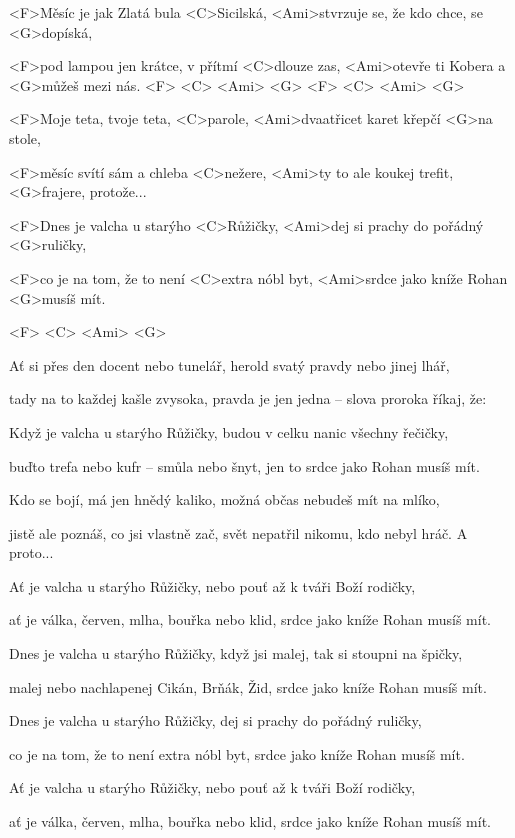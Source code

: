

\zs
<F>Měsíc je jak Zlatá bula <C>Sicilská,
<Ami>stvrzuje se, že kdo chce, se <G>dopíská,

<F>pod lampou jen krátce, v přítmí <C>dlouze zas,
<Ami>otevře ti Kobera a <G>můžeš mezi nás.
<F> <C> <Ami> <G> <F> <C> <Ami> <G>
\ks

\zs
<F>Moje teta, tvoje teta, <C>parole,
<Ami>dvaatřicet karet křepčí <G>na stole,

<F>měsíc svítí sám a chleba <C>nežere,
<Ami>ty to ale koukej trefit, <G>frajere, protože...
\ks

\zr
<F>Dnes je valcha u starýho <C>Růžičky,
<Ami>dej si prachy do pořádný <G>ruličky,

<F>co je na tom, že to není <C>extra nóbl byt,
<Ami>srdce jako kníže Rohan <G>musíš mít.

<F> <C> <Ami> <G>
\kr

\zs
Ať si přes den docent nebo tunelář,
herold svatý pravdy nebo jinej lhář,

tady na to každej kašle zvysoka,
pravda je jen jedna -- slova proroka říkaj, že:
\ks

\zr
Když je valcha u starýho Růžičky,
budou v celku nanic všechny řečičky,

buďto trefa nebo kufr -- smůla nebo šnyt,
jen to srdce jako Rohan musíš mít.
\kr

\zs
Kdo se bojí, má jen hnědý kaliko,
možná občas nebudeš mít na mlíko,

jistě ale poznáš, co jsi vlastně zač,
svět nepatřil nikomu, kdo nebyl hráč.
A proto...
\ks

\zr
Ať je valcha u starýho Růžičky,
nebo pouť až k tváři Boží rodičky,

ať je válka, červen, mlha, bouřka nebo klid,
srdce jako kníže Rohan musíš mít.
\kr

\zr
Dnes je valcha u starýho Růžičky,
když jsi malej, tak si stoupni na špičky,

malej nebo nachlapenej Cikán, Brňák, Žid,
srdce jako kníže Rohan musíš mít.
\kr

\zr
Dnes je valcha u starýho Růžičky,
dej si prachy do pořádný ruličky,

co je na tom, že to není extra nóbl byt,
srdce jako kníže Rohan musíš mít.
\kr

\zr
Ať je valcha u starýho Růžičky,
nebo pouť až k tváři Boží rodičky,

ať je válka, červen, mlha, bouřka nebo klid,
srdce jako kníže Rohan musíš mít.
\kr

\kp





